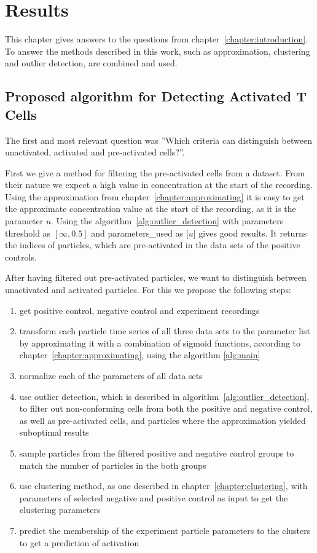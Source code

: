 \chapter{Results}
\label{chapter:results}

This chapter gives answers to the questions from chapter~\ref{chapter:introduction}. To answer the methods described in this work, such as approximation, clustering and outlier detection, are combined and used.

\section{Proposed algorithm for Detecting Activated T Cells}
\label{sec:proposed-algorithm}

The first and most relevant question was ''Which criteria can distinguish between unactivated, activated and pre-activated cells?''.

First we give a method for filtering the pre-activated cells from a dataset. From their nature we expect a high value in \Calcium concentration at the start of the recording. Using the approximation from chapter~\ref{chapter:approximating} it is easy to get the approximate \Calcium concentration value at the start of the recording, as it is the parameter $u$. Using the algorithm~\ref{alg:outlier_detection} with parameters threshold as $[\infty, 0.5]$ and parameters\_used as [$u$] gives good results. It returns the indices of particles, which are pre-activated in the data sets of the positive controls.

After having filtered out pre-activated particles, we want to distinguish between unactivated and activated particles. For this we propose the following steps:

\begin{enumerate}
	\item get positive control, negative control and experiment recordings
	\item transform each particle time series of all three data sets to the parameter list by approximating it with a combination of sigmoid functions, according to chapter~\ref{chapter:approximating}, using the algorithm \ref{alg:main}
	\item normalize each of the parameters of all data sets
	\item use outlier detection, which is described in algorithm~\ref{alg:outlier_detection}, to filter out non-conforming cells from both the positive and negative control, as well as pre-activated cells, and particles where the approximation yielded suboptimal results
	\item sample particles from the filtered positive and negative control groups to match the number of particles in the both groups
	\item use clustering method, as one described in chapter~\ref{chapter:clustering}, with parameters of selected negative and positive control as input to get the clustering parameters
	\item predict the membership of the experiment particle parameters to the clusters to get a prediction of activation
\end{enumerate}


